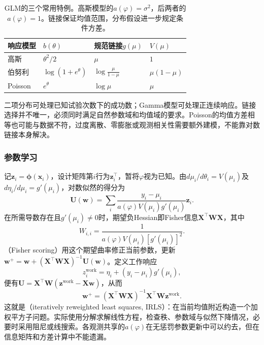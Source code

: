 \begin{table}[htbp]
  \centering
  \begin{tabular}{llll}
    \toprule
    响应模型 & $b(\theta)$ & 规范链接$g(\mu)$ & $V(\mu)$\\
    \midrule
    高斯 & $\theta^2/2$ & $\mu$ & $1$\\
    伯努利 & $\log(1+e^\theta)$ & $\log\frac{\mu}{1-\mu}$ & $\mu(1-\mu)$\\
    Poisson & $e^\theta$ & $\log\mu$ & $\mu$\\
    \bottomrule
  \end{tabular}
  \caption{GLM的三个常用特例。高斯模型的$a(\varphi)=\sigma^2$，后两者的$a(\varphi)=1$。链接保证均值范围，分布假设进一步规定条件方差。}
  \label{tab:regression-glm}
\end{table}

二项分布可处理已知试验次数下的成功数；Gamma模型可处理正连续响应。链接选择并不唯一，必须同时满足自然参数域和均值域的要求。Poisson的均值方差相等也可能与数据不符，过度离散、零膨胀或观测相关性需要额外建模，不能靠对数链接本身解决。

\subsubsection{参数学习}

记$\bm{z}_i=\bm{\phi}(\bm{x}_i)$，设计矩阵第$i$行为$\bm{z}_i^{\top}$，暂将$\varphi$视为已知。由$d\mu_i/d\theta_i=V(\mu_i)$及$d\eta_i/d\mu_i=g'(\mu_i)$，对数似然的得分为
\begin{equation}
  \bm{U}(\bm{w})
  =\sum_i\frac{y_i-\mu_i}
    {a(\varphi)V(\mu_i)g'(\mu_i)}\bm{z}_i.
  \label{eq:regression-glm-score}
\end{equation}
在所需导数存在且$g'(\mu_i)\ne0$时，期望负Hessian即Fisher信息$\bm{X}^{\top}\bm{W}\bm{X}$，其中
\[
  W_{i,i}=\frac{1}{a(\varphi)V(\mu_i)[g'(\mu_i)]^2}.
\]
（Fisher scoring）用这个期望曲率修正当前参数，更新$\bm{w}^{+}=\bm{w}+(\bm{X}^{\top}\bm{W}\bm{X})^{-1}\bm{U}(\bm{w})$。定义工作响应
\[
  z_i^{\mathrm{work}}
    =\eta_i+(y_i-\mu_i)g'(\mu_i),
\]
便有$\bm{U}=\bm{X}^{\top}\bm{W}(\bm{z}^{\mathrm{work}}-\bm{X}\bm{w})$，从而
\begin{equation}
  \bm{w}^{+}
  =(\bm{X}^{\top}\bm{W}\bm{X})^{-1}
     \bm{X}^{\top}\bm{W}\bm{z}^{\mathrm{work}}.
  \label{eq:regression-irls}
\end{equation}
这就是（iteratively reweighted least squares, IRLS）：在当前均值附近构造一个加权平方子问题。实际使用分解求解线性方程，检查秩、参数域与似然下降情况，必要时采用阻尼或线搜索。各观测共享的$a(\varphi)$在无惩罚参数更新中可以约去，但在信息矩阵和方差计算中不能遗漏。

